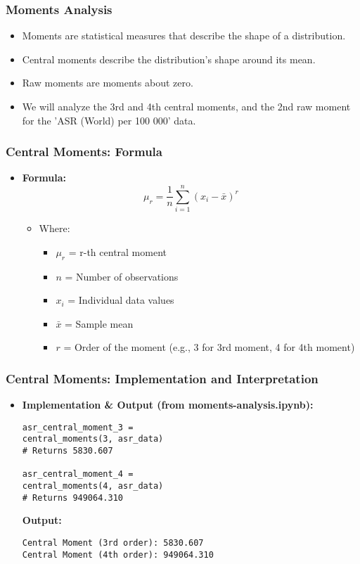 \begin{frame}
    \frametitle{Moments Analysis}
    \begin{itemize}
        \item Moments are statistical measures that describe the shape of a distribution.
        \item Central moments describe the distribution's shape around its mean.
        \item Raw moments are moments about zero.
        \item We will analyze the 3rd and 4th central moments, and the 2nd raw moment for the 'ASR (World) per 100 000' data.
    \end{itemize}
\end{frame}

\begin{frame}[fragile]
    \frametitle{Central Moments: Formula}
    \begin{itemize}
        \item \textbf{Formula:}
              \[
                  \mu_r = \frac{1}{n} \sum_{i=1}^{n} (x_i - \bar{x})^r
              \]
              \begin{itemize}
                  \item Where:
                        \begin{itemize}
                            \item $\mu_r$ = r-th central moment
                            \item $n$ = Number of observations
                            \item $x_i$ = Individual data values
                            \item $\bar{x}$ = Sample mean
                            \item $r$ = Order of the moment (e.g., 3 for 3rd moment, 4 for 4th moment)
                        \end{itemize}
              \end{itemize}
    \end{itemize}
\end{frame}

\begin{frame}[fragile]
    \frametitle{Central Moments: Implementation and Interpretation}
    \begin{itemize}
        \item \textbf{Implementation \& Output (from moments-analysis.ipynb):}
              \begin{lstlisting}
asr_central_moment_3 =
central_moments(3, asr_data)
# Returns 5830.607

asr_central_moment_4 =
central_moments(4, asr_data)
# Returns 949064.310
        \end{lstlisting}
              \textbf{Output:}
              \begin{verbatim}
Central Moment (3rd order): 5830.607
Central Moment (4th order): 949064.310
        \end{verbatim}
    \end{itemize}
\end{frame}

